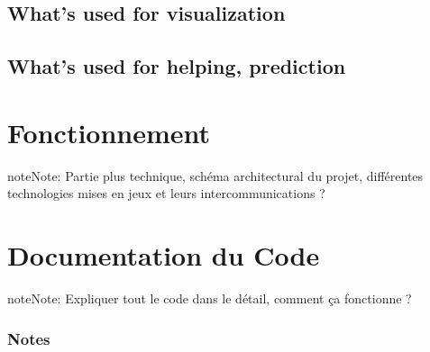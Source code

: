 \documentclass[letterpaper,10pt,english]{sphinxmanual}
\begin{document}
\subsection{What’s used for visualization}
\label{\detokenize{Usage:what-s-used-for-visualization}}

\subsection{What’s used for helping, prediction}
\label{\detokenize{Usage:what-s-used-for-helping-prediction}}
\sphinxstepscope


\section{Fonctionnement}
\label{\detokenize{Fonctionnement:fonctionnement}}\label{\detokenize{Fonctionnement::doc}}
\begin{sphinxadmonition}{note}{Note:}
\sphinxAtStartPar
Partie plus technique, schéma architectural du projet, différentes technologies mises en jeux et leurs intercommunications ?
\end{sphinxadmonition}
\label{\detokenize{Fonctionnement:id1}}
\sphinxstepscope


\section{Documentation du Code}
\label{\detokenize{CodeSource:documentation-du-code}}\label{\detokenize{CodeSource::doc}}
\begin{sphinxadmonition}{note}{Note:}
\sphinxAtStartPar
Expliquer tout le code dans le détail, comment ça fonctionne ?
\end{sphinxadmonition}
\label{\detokenize{CodeSource:codesource}}\subsubsection*{Notes}



\renewcommand{\indexname}{Index}
\printindex
\end{document}
